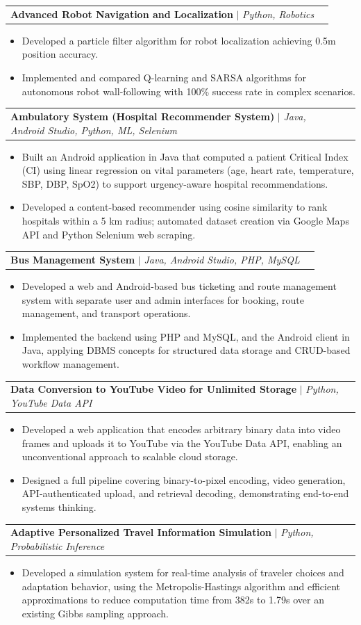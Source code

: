 \documentclass[letterpaper,11pt]{article}
\makeatletter
\newcommand{\resumeItem}[1]{
  \item\small{
    {#1 \vspace{-2pt}}
  }
}
\newcommand{\resumeProjectHeading}[2]{
    \item
    \begin{tabular*}{0.97\textwidth}{l@{\extracolsep{\fill}}r}
      \small#1 & #2 \\
    \end{tabular*}\vspace{-7pt}
}
\newcommand{\resumeItemListStart}{\begin{itemize}[noitemsep, topsep=0pt, parsep=0pt]}
\newcommand{\resumeItemListEnd}{\end{itemize}\vspace{-5pt}}
\makeatother
\begin{document}
  \resumeProjectHeading
    {\textbf{Advanced Robot Navigation and Localization} $|$ \emph{Python, Robotics}}{}
    \resumeItemListStart
      \resumeItem{Developed a particle filter algorithm for robot localization achieving 0.5m position accuracy.}
      \resumeItem{Implemented and compared Q-learning and SARSA algorithms for autonomous robot wall-following with 100\% success rate in complex scenarios.}
    \resumeItemListEnd

  \resumeProjectHeading
    {\textbf{Ambulatory System (Hospital Recommender System)} $|$ \emph{Java, Android Studio, Python, ML, Selenium}}{}
    \resumeItemListStart
      \resumeItem{Built an Android application in Java that computed a patient Critical Index (CI) using linear regression on vital parameters (age, heart rate, temperature, SBP, DBP, SpO2) to support urgency-aware hospital recommendations.}
      \resumeItem{Developed a content-based recommender using cosine similarity to rank hospitals within a 5 km radius; automated dataset creation via Google Maps API and Python Selenium web scraping.}
    \resumeItemListEnd

  \resumeProjectHeading
    {\textbf{Bus Management System} $|$ \emph{Java, Android Studio, PHP, MySQL}}{}
    \resumeItemListStart
      \resumeItem{Developed a web and Android-based bus ticketing and route management system with separate user and admin interfaces for booking, route management, and transport operations.}
      \resumeItem{Implemented the backend using PHP and MySQL, and the Android client in Java, applying DBMS concepts for structured data storage and CRUD-based workflow management.}
    \resumeItemListEnd

  \resumeProjectHeading
    {\textbf{Data Conversion to YouTube Video for Unlimited Storage} $|$ \emph{Python, YouTube Data API}}{}
    \resumeItemListStart
      \resumeItem{Developed a web application that encodes arbitrary binary data into video frames and uploads it to YouTube via the YouTube Data API, enabling an unconventional approach to scalable cloud storage.}
      \resumeItem{Designed a full pipeline covering binary-to-pixel encoding, video generation, API-authenticated upload, and retrieval decoding, demonstrating end-to-end systems thinking.}
    \resumeItemListEnd

  \resumeProjectHeading
    {\textbf{Adaptive Personalized Travel Information Simulation} $|$ \emph{Python, Probabilistic Inference}}{}
    \resumeItemListStart
      \resumeItem{Developed a simulation system for real-time analysis of traveler choices and adaptation behavior, using the Metropolis-Hastings algorithm and efficient approximations to reduce computation time from 382s to 1.79s over an existing Gibbs sampling approach.}
    \resumeItemListEnd
\end{document}
